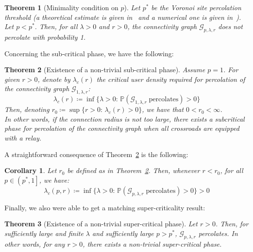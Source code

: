 \documentclass[10pt,a4paper]{amsart}
\theoremstyle{exampstyle}
\newtheorem{Theorem}{Theorem}
\newtheorem{Corollary}{Corollary}
\theoremstyle{exampnotations}
\begin{document}
\begin{Theorem}[Minimality condition on $p$]
\label{Thm.minimality}
Let $p^*$ be the Voronoi site percolation threshold (a theoretical estimate is given in~\cite{neher2008topological} and a numerical one is given in~\cite{becker_percolation_2009}). Let $p < p^*$. Then, for all $\lambda > 0$ and $r >0$, the connectivity graph $\mathcal{G}_{p,\lambda,r}$ does not percolate with probability 1.
\end{Theorem}

Concerning the sub-critical phase, we have the following:
\begin{Theorem}[Existence of a non-trivial sub-critical phase]
\label{Thm.subcritical}
Assume $p=1$. %
For given $r>0$, denote by $\lambda_c(r)$ the critical user density required for percolation of the connectivity graph $\mathcal{G}_{1,\lambda,r}$:
\begin{equation*}
    \lambda_c(r) \coloneqq \inf \lbrace \lambda > 0 : \, \mathbb{P}(\mathcal{G}_{1, \lambda, r} \; \text{percolates}) > 0 \rbrace
\end{equation*}
Then, denoting $ r_0 \coloneqq \sup \lbrace r > 0 : \, \lambda_c(r) > 0 \rbrace$, we have that $0 < r_0 < \infty$. \\
In other words, if the connection radius is not too large, there exists a subcritical phase for percolation of the connectivity graph when all crossroads are equipped with a relay.
\end{Theorem}

A straightforward consequence of Theorem~\ref{Thm.subcritical} is the following:

\begin{Corollary}
\label{Coroll.subcritical}
Let $r_0$ be defined as in Theorem~\ref{Thm.subcritical}. Then, whenever $r < r_{0}$, for all $p \in \left(p^*,1\right]$, we have:
\begin{equation*}
    \lambda_c(p,r) \coloneqq \inf \lbrace \lambda > 0 : \, \mathbb{P}(\mathcal{G}_{p,\lambda,r} \; \text{percolates}) > 0 \rbrace > 0
\end{equation*}
\end{Corollary}

Finally, we also were able to get a matching super-criticality result:

\begin{Theorem}[Existence of a non-trivial super-critical phase]
\label{Thm.supercritical}
Let $r > 0$. Then, for sufficiently large and finite $\lambda$ and sufficiently large $p > p^*$, $\mathcal{G}_{p,\lambda,r}$ percolates. In other words, for any $r > 0$, there exists a non-trivial super-critical phase.
\end{Theorem}
\end{document}
